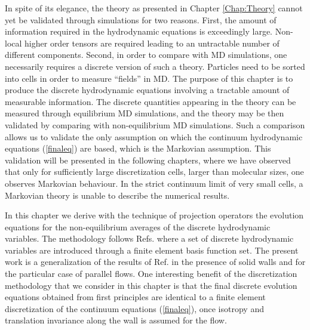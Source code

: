 \documentclass[b5paper,openright,11pt]{book}
\begin{document}
In   spite   of   its   elegance,   the   theory   as   presented   in
Chapter \ref{Chap:Theory}  cannot yet  be validated  through simulations
for two  reasons.  First,  the amount of  information required  in the
hydrodynamic equations  is exceedingly  large. Non-local  higher order
tensors are  required leading  to an  untractable number  of different
components.   Second, in  order to  compare with  MD simulations,  one
necessarily requires  a discrete version  of such a  theory. Particles
need to  be sorted into  cells in order  to measure ``fields''  in MD.
The  purpose  of  this chapter  is  to  produce  the  discrete
hydrodynamic  equations involving  a  tractable  amount of  measurable
information. The  discrete quantities appearing  in the theory  can be
measured through  equilibrium MD  simulations, and  the theory  may be
then validated by comparing with non-equilibrium MD simulations.  Such
a comparison  allows us to validate  the only assumption on  which the
continuum hydrodynamic equations (\ref{finaleq}) are
based, which  is the  Markovian assumption.   This validation  will be
presented in the following chapters, where  we have observed  that only
for  sufficiently large  discretization cells,  larger than  molecular
sizes,  one observes  Markovian  behaviour.  In  the strict  continuum
limit of  very small cells, a  Markovian theory is unable  to describe
the numerical  results.  

In  this chapter  we  derive  with  the technique  of  projection
operators the  evolution equations for the  non-equilibrium averages of
the discrete  hydrodynamic variables.   The methodology  follows Refs.
\cite{Espanol2009i,Espanol2009c,DelaTorre2015,EspanolDonev2015}  where
a  set of  discrete hydrodynamic  variables are  introduced through  a
finite  element   basis  function   set.   The   present  work   is  a
generalization of the results  of Ref.  \cite{EspanolDonev2015} in the
presence of solid walls and for the particular case of parallel flows.
One
interesting benefit of the discretization methodology that we consider
in this chapter is that  the final discrete evolution equations obtained
from first principles are identical to a finite element discretization
of the  continuum equations  (\ref{finaleq}),  once isotropy
and translation invariance along the wall is assumed for the flow.
\end{document}
